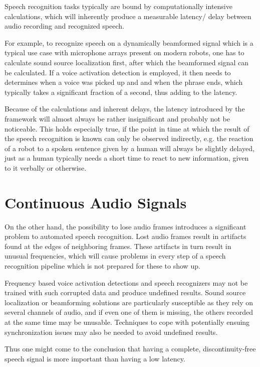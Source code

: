 Speech recognition tasks typically are bound by computationally intensive calculations, which will inherently produce a measurable latency/ delay between audio recording and recognized speech.  
	
For example, to recognize speech on a dynamically beamformed signal which is a typical use case with microphone arrays present on modern robots, one has to calculate sound source localization first, after which the beamformed signal can be calculated.
If a voice activation detection is employed, it then needs to determines when a voice was picked up and and when the phrase ends, which typically takes a significant fraction of a second, thus adding to the latency. 
	
Because of the calculations and inherent delays, the latency introduced by the framework will almost always be rather insignificant and probably not be noticeable. 
This holds especially true, if the point in time at which the result of the speech recognition is known can only be observed indirectly, e.g. the reaction of a robot to a spoken sentence given by a human will always be slightly delayed, just as a human typically needs a short time to react to new information, given to it verbally or otherwise.

\section{Continuous Audio Signals}
On the other hand, the possibility to lose audio frames introduces a significant problem to automated speech recognition.
Lost audio frames result in artifacts found at the edges of neighboring frames. 
These artifacts in turn result in unusual frequencies, which will cause problems in every step of a speech recognition pipeline which is not prepared for these to show up. 

Frequency based voice activation detections and speech recognizers may not be trained with such corrupted data and produce undefined results.
Sound source localization or beamforming solutions are particularly susceptible as they rely on several channels of audio, and if even one of them is missing, the others recorded at the same time may be unusable.
Techniques to cope with potentially ensuing synchronization issues may also be needed to avoid undefined results.
	
Thus one might come to the conclusion that having a complete, discontinuity-free speech signal is more important than having a low latency.

